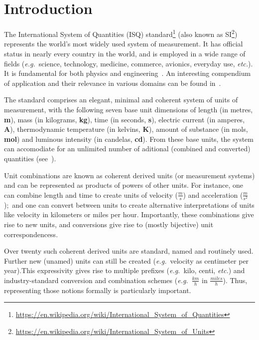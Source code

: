 \documentclass[runningheads,a4paper]{llncs}
\begin{document}
\section{Introduction}\label{sec:intro}

The International System of Quantities (ISQ) standard\footnote{\url{https://en.wikipedia.org/wiki/International_System_of_Quantities}} (also known as SI\footnote{\url{https://en.wikipedia.org/wiki/International_System_of_Units}}) represents the world's most widely used system of measurement. It has official status in nearly every country in the world, and is employed in a wide range of fields (\textit{e.g.}~science, technology, medicine, commerce, avionics, everyday use, \textit{etc.}). It is fundamental for both physics and engineering~\cite{bipm-jcgm:2012:VIM}. An interesting compendium of application and their relevance in various domains can be found in~\cite{NPL-book}. 

The standard comprises an elegant, minimal and coherent system of units of measurement, with the following seven base unit dimensions of length (in metres, \textbf{m}), mass (in kilograms, \textbf{kg}), time (in seconds, \textbf{s}), electric current (in amperes, \textbf{A}), thermodynamic temperature (in kelvins, \textbf{K}), amount of substance (in mols, \textbf{mol}) and luminous intensity (in candelas, \textbf{cd}). From these base units, the system can accomodiate for an unlimited number of aditional (combined and converted) quantities (see~). 

Unit combinations are known as coherent derived units (or measurement systems) and can be represented as products of powers of other units. For instance, one can combine length and time to create units of velocity (\(\frac{m}{s}\)) and acceleration (\(\frac{m}{s^2}\));~and one can convert between units to create alternative interpretations of units like velocity in kilometers or miles per hour. Importantly, these combinations give rise to new units, and conversions give rise to (mostly bijective) unit correspondencess. 

Over twenty such coherent derived units are standard, named and routinely used. Further new (unamed) units can still be created (\textit{e.g.}~velocity as centimeter per year).This expressivity gives rise to multiple prefixes (\textit{e.g.}~kilo, centi, \textit{etc.}) and industry-standard conversion and combination schemes (\textit{e.g.}~\(\frac{km}{h}\) in \(\frac{miles}{h}\)). Thus, representing those notions formally is particularly important. 
\end{document}
